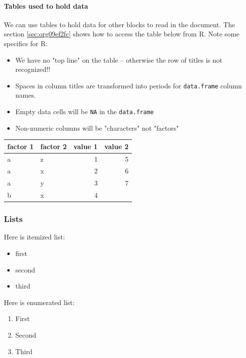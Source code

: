 \documentclass[11pt]{article}
\begin{document}
\paragraph{Tables used to hold data}
\label{sec:orgfef9e43}

We can use tables to hold data for other blocks to read in the document.  The
section \ref{sec:org09ef2fc} shows how to access
the table below from R.  Note some specifics for R:
\begin{itemize}
\item We have no "top line" on the table -- otherwise the row of titles is not recognized!!
\item Spaces in column titles are transformed into periods for \texttt{data.frame} column names.
\item Empty data cells will be \texttt{NA} in the \texttt{data.frame}
\item Non-numeric columns will be "characters" not "factors"
\end{itemize}

\begin{table}[htbp]
\label{tab:orge4ece1c}
\centering
\begin{tabular}{llrr}
factor 1 & factor 2 & value 1 & value 2\\
\hline
a & z & 1 & 5\\
a & x & 2 & 6\\
a & y & 3 & 7\\
b & x & 4 & \\
\end{tabular}
\end{table}

\subsubsection{Lists}
\label{sec:org71d1d4a}

Here is itemized list:

\begin{itemize}
\item first
\item second
\item third
\end{itemize}

Here is enumerated list:

\begin{enumerate}
\item First
\item Second
\item Third
\end{enumerate}
\end{document}
